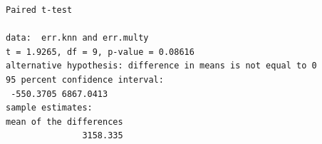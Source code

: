 \documentclass{paper}
\begin{document}
\begin{minipage}{\linewidth}
  \begin{lstlisting}[caption={Results of paired t-test 1-NN vs. multiple regression.},
    label=list:res4]
	Paired t-test

data:  err.knn and err.multy
t = 1.9265, df = 9, p-value = 0.08616
alternative hypothesis: difference in means is not equal to 0
95 percent confidence interval:
 -550.3705 6867.0413
sample estimates:
mean of the differences 
               3158.335 
  \end{lstlisting}
\end{minipage}
\end{document}
